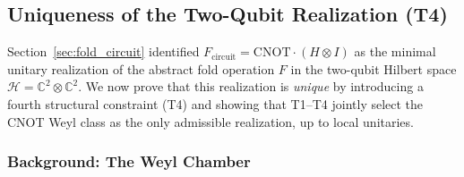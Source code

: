 %
%
%   
%

% 

\subsection{Uniqueness of the Two-Qubit Realization (T4)}
\label{sec:T4_uniqueness}

Section~\ref{sec:fold_circuit} identified
$F_{\mathrm{circuit}} = \mathrm{CNOT} \cdot (H \otimes I)$
as the minimal unitary realization of the abstract fold operation $F$
in the two-qubit Hilbert space $\mathcal{H} = \mathbb{C}^2 \otimes \mathbb{C}^2$.
We now prove that this realization is \emph{unique} by introducing a
fourth structural constraint (T4) and showing that T1--T4 jointly select
the CNOT Weyl class as the only admissible realization, up to local unitaries.

\subsubsection*{Background: The Weyl Chamber}

